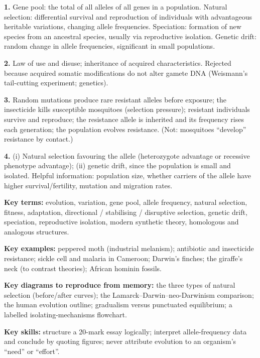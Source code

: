 \documentclass[11pt]{article}
\newcounter{popsec}
\newcounter{popsub}
\newcommand{\courssub}[1]{%
  \stepcounter{popsub}%
  \par\vspace{9pt}\noindent{\popxbold\fontsize{11.5}{13}\selectfont\color{popink}{\color{poporange}\thepopsec.\thepopsub}\hspace{6pt}#1}\par\nopagebreak\vspace{4pt}
}
\begin{document}
\begin{corrige}
\textbf{1.} Gene pool: the total of all alleles of all genes in a population. Natural selection: differential survival and reproduction of individuals with advantageous heritable variations, changing allele frequencies. Speciation: formation of new species from an ancestral species, usually via reproductive isolation. Genetic drift: random change in allele frequencies, significant in small populations.

\textbf{2.} Law of use and disuse; inheritance of acquired characteristics. Rejected because acquired somatic modifications do not alter gamete DNA (Weismann's tail-cutting experiment; genetics).

\textbf{3.} Random mutations produce rare resistant alleles before exposure; the insecticide kills susceptible mosquitoes (selection pressure); resistant individuals survive and reproduce; the resistance allele is inherited and its frequency rises each generation; the population evolves resistance. (Not: mosquitoes ``develop'' resistance by contact.)

\textbf{4.} (i) Natural selection favouring the allele (heterozygote advantage or recessive phenotype advantage); (ii) genetic drift, since the population is small and isolated. Helpful information: population size, whether carriers of the allele have higher survival/fertility, mutation and migration rates.
\end{corrige}

\courssub{Final Revision Checklist}

\begin{aretenir}
\textbf{Key terms:} evolution, variation, gene pool, allele frequency, natural selection, fitness, adaptation, directional / stabilising / disruptive selection, genetic drift, speciation, reproductive isolation, modern synthetic theory, homologous and analogous structures.

\textbf{Key examples:} peppered moth (industrial melanism); antibiotic and insecticide resistance; sickle cell and malaria in Cameroon; Darwin's finches; the giraffe's neck (to contrast theories); African hominin fossils.

\textbf{Key diagrams to reproduce from memory:} the three types of natural selection (before/after curves); the Lamarck--Darwin--neo-Darwinism comparison; the human evolution outline; gradualism versus punctuated equilibrium; a labelled isolating-mechanisms flowchart.

\textbf{Key skills:} structure a 20-mark essay logically; interpret allele-frequency data and conclude by quoting figures; never attribute evolution to an organism's ``need'' or ``effort''.
\end{aretenir}
\end{document}

